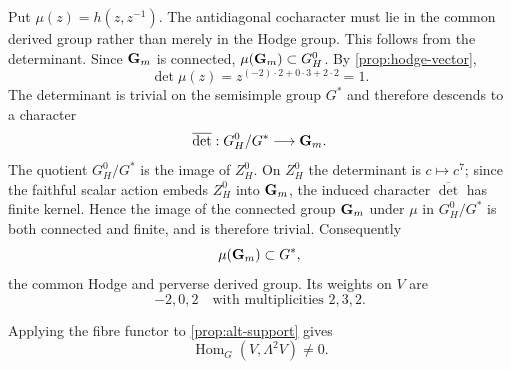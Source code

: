 Put $\mu(z)=h(z,z^{-1})$.  The antidiagonal cocharacter must lie in the
common derived group rather than merely in the Hodge group.  This follows from
the determinant.  Since $\mathbf G_m$ is connected,
$\mu(\mathbf G_m)\subset G_H^0$.  By \cref{prop:hodge-vector},
\[
 \det\mu(z)=z^{(-2)\cdot2+0\cdot3+2\cdot2}=1.
\]
The determinant is trivial on the semisimple group $G^*$ and therefore
descends to a character
\[
 \overline{\det}:G_H^0/G^*\longrightarrow\mathbf G_m.
\]
The quotient $G_H^0/G^*$ is the image of $Z_H^0$.  On $Z_H^0$ the
determinant is $c\mapsto c^7$; since the faithful scalar action embeds
$Z_H^0$ into $\mathbf G_m$, the induced character $\overline{\det}$ has finite
kernel.  Hence the image of the connected group $\mathbf G_m$ under $\mu$ in
$G_H^0/G^*$ is both connected and finite, and is therefore trivial.
Consequently
\[
 \mu(\mathbf G_m)\subset G^*,
\]
the common Hodge and perverse derived group.  Its weights on $V$ are
\begin{equation}
 -2,0,2\quad\text{with multiplicities }2,3,2.
\label{eq:hodge-weights}
\end{equation}

Applying the fibre functor to \cref{prop:alt-support} gives
\begin{equation}
 \operatorname{Hom}_G(V,\Lambda^2V)\ne0.
\label{eq:hom-exterior}
\end{equation}

